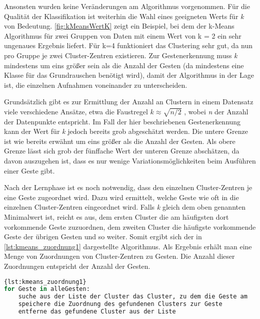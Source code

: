 Ansonsten wurden keine Veränderungen am Algorithmus vorgenommen.
Für die Qualität der Klassifikation ist weiterhin die Wahl eines geeigneten Werts für \emph{k} von Bedeutung. \autoref{fig:kMeansWertK} zeigt ein Beispiel, bei dem der k-Means Algorithmus für zwei Gruppen von Daten mit einem Wert von k = 2 ein sehr ungenaues Ergebnis liefert. Für k=4 funktioniert das Clustering sehr gut, da 
nun pro Gruppe je zwei Cluster-Zentren existieren.
Zur Gestenerkennung muss \emph{k} mindestens um eins größer sein als die Anzahl der Gesten (da mindestens eine Klasse für das Grundrauschen benötigt wird),
damit der Algorithmus in der Lage ist, die einzelnen Aufnahmen voneinander zu unterscheiden.  


Grundsätzlich gibt es zur Ermittlung der Anzahl an Clustern in einem Datensatz viele verschiedene Ansätze, etwa die Faustregel $k \approx \sqrt{n/2}$ \cite{WikipediaKMeansKValue}, wobei \emph{n} der Anzahl der Datenpunkte entspricht. Im Fall der hier beschriebenen Gestenerkennung kann der Wert für \emph{k} jedoch bereits grob abgeschätzt werden. 
Die untere Grenze ist wie bereits erwähnt um eins größer als die Anzahl der Gesten.
Als obere Grenze lässt sich grob der fünffache Wert der unteren Grenze abschätzen, da davon auszugehen ist, dass es nur wenige Variationsmöglichkeiten beim Ausführen einer Geste gibt.

Nach der Lernphase ist es noch notwendig, dass den einzelnen Cluster-Zentren je eine Geste zugeordnet wird. Dazu wird ermittelt, welche Geste wie oft in die einzelnen Cluster-Zentren eingeordnet wird. Falls \emph{k} gleich dem oben genannten Minimalwert ist, reicht es aus, dem ersten Cluster die am häufigsten dort vorkommende Geste zuzuordnen, dem zweiten Cluster die häufigste vorkommende Geste der übrigen Gesten und so weiter.
Somit ergibt sich der in 
\autoref{lst:kmeans_zuordnung1}
dargestellte Algorithmus.
Als Ergebnis erhält man eine Menge von Zuordnungen von Cluster-Zentren zu Gesten. Die Anzahl dieser Zuordnungen entspricht der Anzahl der Gesten.

\begin{lstlisting}[language=Python,caption={Pseudocode der Zuordnung von Cluster-Zentren zu Gesten, Variante 1},label={lst:kmeans_zuordnung1}]{lst:kmeans_zuordnung1}
for Geste in alleGesten:
    suche aus der Liste der Cluster das Cluster, zu dem die Geste am      häufigsten zugeordnet wird
    speichere die Zuordnung des gefundenen Clusters zur Geste
    entferne das gefundene Cluster aus der Liste
\end{lstlisting}

